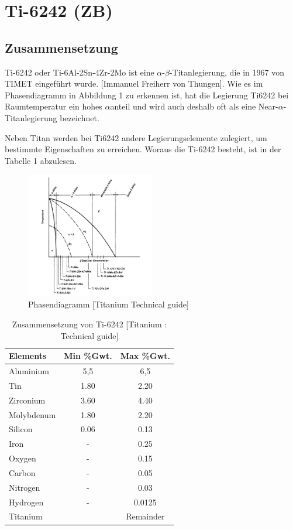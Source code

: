 \section{Ti-6242 (ZB)}

\subsection{Zusammensetzung}
Ti-6242 oder Ti-6Al-2Sn-4Zr-2Mo ist eine $\alpha$-$\beta$-Titanlegierung, die  in 1967 von TIMET eingeführt wurde. [Immanuel Freiherr von Thungen]. 
Wie es im Phasendiagramm in Abbildung 1 zu erkennen ist, hat die Legierung Ti6242 bei Raumtemperatur ein hohes $\alpha$anteil und wird auch deshalb oft als eine Near-$\alpha$-Titanlegierung bezeichnet.

Neben Titan werden bei Ti6242 andere Legierungselemente zulegiert, um bestimmte Eigenschaften zu erreichen. Woraus die Ti-6242 besteht, ist in der Tabelle 1 abzulesen.


\begin{figure}[H]
	\centering
	\includegraphics[width=0.5\textwidth]{Bilder/Phasendiagram}
	\caption{Phasendiagramm [Titanium Technical guide]}
	\label{PD-Ti6242}
\end{figure}





\begin{table}[H]
	
	\centering	
	\begin{tabular}{|l |c |c|}
		\hline
		\centering
		\hspace{20ex}Elements \hspace{20ex} & Min \%Gwt. & Max \%Gwt.\\
		\hline
		Aluminium&5,5&6,5\\
		Tin&1.80&2.20\\
		Zirconium&3.60&4.40\\
		Molybdenum&1.80&2.20\\
		Silicon &0.06&0.13\\
		Iron&-&0.25\\
		Oxygen&-&0.15\\
		Carbon&	-&	0.05\\
		Nitrogen&-&0.03\\
		Hydrogen&-&0.0125\\
		
		Titanium &&Remainder\\
		\hline
	\end{tabular}
	\caption{Zusammensetzung von Ti-6242 [Titanium : Technical guide]}
\end{table}


